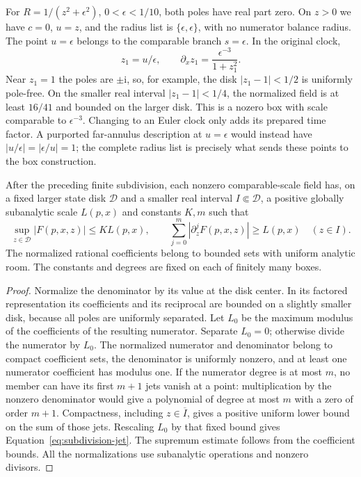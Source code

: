 \begin{example}
\label{ex:subdivision-comparable-poles}
For $R=1/(z^2+\epsilon^2)$, $0<\epsilon<1/10$, both poles have real
part zero.  On $z>0$ we have $c=0$, $u=z$, and the radius list is
$\{\epsilon,\epsilon\}$, with no numerator balance radius.
The point $u=\epsilon$ belongs to the comparable branch $s=\epsilon$.
In the original clock,
\[
 z_1=u/\epsilon,\qquad
 \partial_xz_1=\frac{\epsilon^{-3}}{1+z_1^2}.
\]
Near $z_1=1$ the poles are $\pm\mathrm i$, so, for example, the disk
$|z_1-1|<1/2$ is uniformly pole-free.  On the smaller real interval
$|z_1-1|<1/4$, the normalized field is at least $16/41$ and bounded
on the larger disk.  This is a nozero box with scale comparable to
$\epsilon^{-3}$.  Changing to an Euler clock only adds its prepared
time factor.  A purported far-annulus description at $u=\epsilon$
would instead have $|u/\epsilon|=|\epsilon/u|=1$; the complete radius
list is precisely what sends these points to the box construction.
\end{example}

\begin{lemma}
\label{lem:subdivision-box-data}
After the preceding finite subdivision, each nonzero comparable-scale
field has, on a fixed larger state disk $\mathcal D$ and a smaller real
interval $I\Subset\mathcal D$, a positive globally subanalytic scale
$L(p,x)$ and constants $K,m$ such that
\begin{equation}
\label{eq:subdivision-jet}
 \sup_{z\in\mathcal D}|F(p,x,z)|\le KL(p,x),\qquad
 \sum_{j=0}^{m}|\partial_z^jF(p,x,z)|\ge L(p,x)
 \quad(z\in I).
\end{equation}
The normalized rational coefficients belong to bounded sets with uniform
analytic room.  The constants and degrees are fixed on each of finitely
many boxes.
\end{lemma}

\begin{proof}
Normalize the denominator by its value at the disk center.  In its
factored representation its coefficients and its reciprocal are bounded
on a slightly smaller disk, because all poles are uniformly separated.
Let $L_0$ be the maximum modulus of the coefficients of the resulting
numerator.  Separate $L_0=0$; otherwise divide the numerator by $L_0$.
The normalized numerator and denominator belong to compact coefficient
sets, the denominator is uniformly nonzero, and at least one numerator
coefficient has modulus one.  If the numerator degree is at most $m$,
no member can have its first $m+1$ jets vanish at a point: multiplication
by the nonzero denominator would give a polynomial of degree at most
$m$ with a zero of order $m+1$.  Compactness, including $z\in\overline I$,
gives a positive uniform lower bound on the sum of those jets.  Rescaling
$L_0$ by that fixed bound gives Equation~\eqref{eq:subdivision-jet}.
The supremum estimate follows from the coefficient bounds.  All the
normalizations use subanalytic operations and nonzero divisors.
\end{proof}

